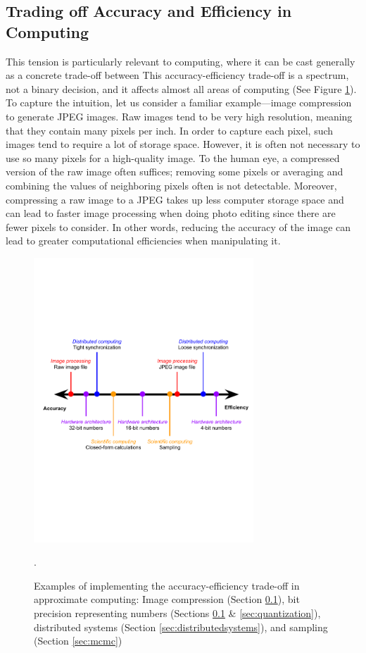 \documentclass[sigplan,screen]{acmart}
\begin{document}
\subsection{Trading off Accuracy and Efficiency in Computing} \label{sec:approximatecomputing}
This tension is particularly relevant to computing, where it can be cast generally as a concrete trade-off between This accuracy-efficiency trade-off is a spectrum, not a binary decision, and it affects almost all areas of computing (See Figure \ref{fig:tradeoff}). To capture the intuition, let us consider a familiar example---image compression to generate JPEG images. Raw images tend to be very high resolution, meaning that they contain many pixels per inch. In order to capture each pixel, such images tend to require a lot of storage space. However, it is often not necessary to use so many pixels for a high-quality image. To the human eye, a compressed version of the raw image often suffices; removing some pixels or averaging and combining the values of neighboring pixels often is not detectable. Moreover, compressing a raw image to a JPEG takes up less computer storage space and can lead to faster image processing when doing photo editing since there are fewer pixels to consider. In other words, reducing the accuracy of the image can lead to greater computational efficiencies when manipulating it.

\begin{figure}[h]
	\includegraphics[width=8.25cm]{figs/accuracyefficiencytradeoff_cropped.pdf}
	\caption{Examples of implementing the accuracy-efficiency trade-off in approximate computing: \color{red}Image compression \color{black} (Section \ref{sec:approximatecomputing}), \color{violet}bit precision representing numbers \color{black}(Sections \ref{sec:approximatecomputing} \& \ref{sec:quantization}), \color{blue}distributed systems \color{black}(Section \ref{sec:distributedsystems}), and \color{orange}sampling \color{black}(Section \ref{sec:mcmc})}.
	\label{fig:tradeoff}
\end{figure}
\end{document}

